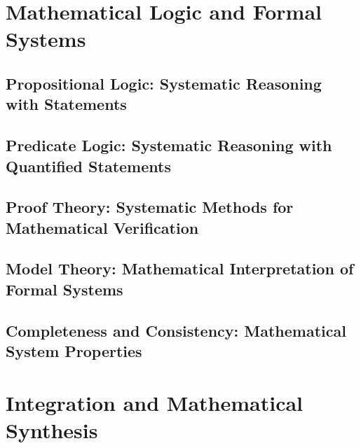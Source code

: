 \documentclass[12pt, oneside, openany]{book}
\begin{document}
\chapter{Mathematical Logic and Formal Systems}

\section{Propositional Logic: Systematic Reasoning with Statements}

\section{Predicate Logic: Systematic Reasoning with Quantified Statements}

\section{Proof Theory: Systematic Methods for Mathematical Verification}

\section{Model Theory: Mathematical Interpretation of Formal Systems}

\section{Completeness and Consistency: Mathematical System Properties}


\chapter{Integration and Mathematical Synthesis}
\end{document}
